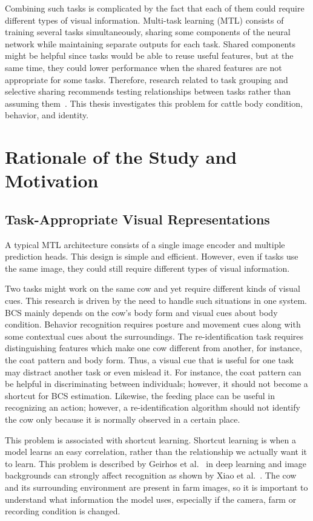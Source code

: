 Combining such tasks is complicated by the fact that each of them could require different types of visual information. Multi-task learning (MTL) consists of training several tasks simultaneously, sharing some components of the neural network while maintaining separate outputs for each task. Shared components might be helpful since tasks would be able to reuse useful features, but at the same time, they could lower performance when the shared features are not appropriate for some tasks. Therefore, research related to task grouping and selective sharing recommends testing relationships between tasks rather than assuming them~\cite{standley2020tasks,misra2016crossstitch}. This thesis investigates this problem for cattle body condition, behavior, and identity.

\section{Rationale of the Study and Motivation}

\subsection{Task-Appropriate Visual Representations}

A typical MTL architecture consists of a single image encoder and multiple prediction heads. This design is simple and efficient. However, even if tasks use the same image, they could still require different types of visual information.

Two tasks might work on the same cow and yet require different kinds of visual cues. This research is driven by the need to handle such situations in one system. BCS mainly depends on the cow's body form and visual cues about body condition. Behavior recognition requires posture and movement cues along with some contextual cues about the surroundings. The re-identification task requires distinguishing features which make one cow different from another, for instance, the coat pattern and body form. Thus, a visual cue that is useful for one task may distract another task or even mislead it. For instance, the coat pattern can be helpful in discriminating between individuals; however, it should not become a shortcut for BCS estimation. Likewise, the feeding place can be useful in recognizing an action; however, a re-identification algorithm should not identify the cow only because it is normally observed in a certain place.

This problem is associated with shortcut learning. Shortcut learning is when a model learns an easy correlation, rather than the relationship we actually want it to learn. This problem is described by Geirhos et al.~\cite{geirhos2020shortcut} in deep learning and image backgrounds can strongly affect recognition as shown by Xiao et al.~\cite{xiao2021background}. The cow and its surrounding environment are present in farm images, so it is important to understand what information the model uses, especially if the camera, farm or recording condition is changed.

